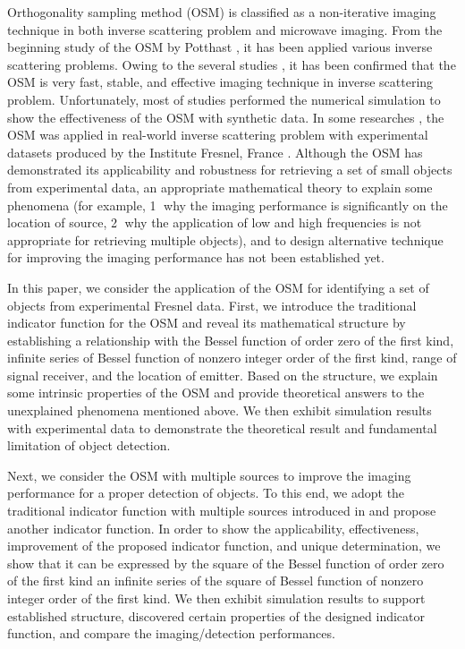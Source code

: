 \documentclass[3p,10pt]{elsarticle}
\theoremstyle{plain}
\theoremstyle{remark}
\begin{document}
Orthogonality sampling method (OSM) is classified as a non-iterative imaging technique in both inverse scattering problem and microwave imaging. From the beginning study of the OSM by Potthast \cite{P1}, it has been applied various inverse scattering problems. Owing to the several studies \cite{ACP,BIPAC,G1,HN,KCP1,LNST}, it has been confirmed that the OSM is very fast, stable, and effective imaging technique in inverse scattering problem. Unfortunately, most of studies performed the numerical simulation to show the effectiveness of the OSM with synthetic data. In some researches \cite{BIPAC,LNST}, the OSM was applied in real-world inverse scattering problem with experimental datasets produced by the Institute Fresnel, France \cite{BS}. Although the OSM has demonstrated its applicability and robustness for retrieving a set of small objects from experimental data, an appropriate mathematical theory to explain some phenomena (for example, \textcircled{1} why the imaging performance is significantly on the location of source, \textcircled{2} why the application of low and high frequencies is not appropriate for retrieving multiple objects), and to design alternative technique for improving the imaging performance has not been established yet.

In this paper, we consider the application of the OSM for identifying a set of objects from experimental Fresnel data. First, we introduce the traditional indicator function for the OSM and reveal its mathematical structure by establishing a relationship with the Bessel function of order zero of the first kind, infinite series of Bessel function of nonzero integer order of the first kind, range of signal receiver, and the location of emitter. Based on the structure, we explain some intrinsic properties of the OSM and  provide theoretical answers to the unexplained phenomena mentioned above. We then exhibit simulation results with experimental data to demonstrate the theoretical result and fundamental limitation of object detection.

Next, we consider the OSM with multiple sources to improve the imaging performance for a proper detection of objects. To this end, we adopt the traditional indicator function with multiple sources introduced in \cite{P1} and propose another indicator function. In order to show the applicability, effectiveness, improvement of the proposed indicator function, and unique determination, we show that it can be expressed by the square of the Bessel function of order zero of the first kind an infinite series of the square of Bessel function of nonzero integer order of the first kind. We then exhibit simulation results to support established structure, discovered certain properties of the designed indicator function, and compare the imaging/detection performances.
\end{document}

